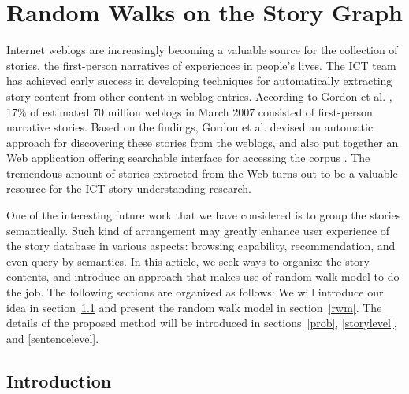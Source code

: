 \documentclass{article}[12pt]
\begin{document}

\section{Random Walks on the Story Graph}

Internet weblogs are increasingly becoming a valuable source for the collection
of stories, the first-person narratives of experiences in people’s lives. The
ICT team has achieved early success in developing techniques for automatically
extracting story content from other content in weblog entries.  According to
Gordon et al. \cite{gordon2007asc}, 17\% of estimated 70 million weblogs in
March 2007 consisted of first-person narrative stories.  Based on the findings,
Gordon et al. devised an automatic approach for discovering these stories from
the weblogs, and also put together an Web application offering searchable
interface for accessing the corpus \cite{gordon2008sfs}.  The tremendous amount
of stories extracted from the Web turns out to be a valuable resource for the
ICT story understanding research.

One of the interesting future work that we have considered is to group the
stories semantically.  Such kind of arrangement may greatly enhance user
experience of the story database in various aspects: browsing capability,
recommendation, and even query-by-semantics.  In this article, we seek ways to
organize the story contents, and introduce an approach that makes use of random
walk model to do the job.  The following sections are organized as follows: We
will introduce our idea in section~\ref{intro} and present the random walk
model in section~\ref{rwm}.  The details of the proposed method will be introduced in
sections~\ref{prob}, \ref{storylevel}, and \ref{sentencelevel}. 

\subsection{Introduction}\label{intro}
\end{document}
